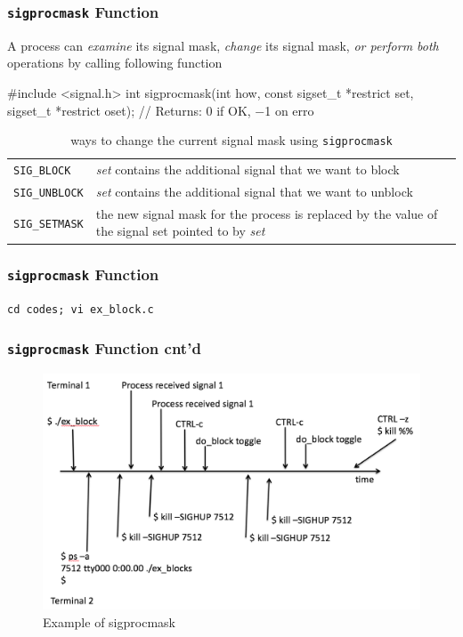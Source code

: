 \documentclass[newPxFont,sthlmFooter,nooffset]{beamer}
\begin{document}
\begin{frame}[fragile,t]
  \frametitle{\texttt{sigprocmask} Function}
A process can \textit{examine} its signal mask, \textit{change} its signal mask, \textit{or perform both} operations by calling following function

\begin{codedef}
#include <signal.h>
int sigprocmask(int how, const sigset_t *restrict set, 
                sigset_t *restrict oset);
// Returns: 0 if OK, −1 on erro    
\end{codedef}

\begin{table}[h]
  \centering
  \begin{tabular}{l | p{8cm}}
    \texttt{SIG\_BLOCK} & \textit{set} contains the additional signal that we want to block \\ 
    \texttt{SIG\_UNBLOCK} & \textit{set} contains the additional signal that we want to unblock \\ 
    \texttt{SIG\_SETMASK} & the new signal mask for the process is replaced by the value of the signal set pointed to by \textit{set}
  \end{tabular}
  \caption{ways to change the current signal mask using \texttt{sigprocmask}}
  \label{tab:sigprocmask}
\end{table}

\end{frame}



\begin{frame}
  \frametitle{\texttt{sigprocmask} Function}
\texttt{cd codes; vi ex\_block.c}


\end{frame}

\begin{frame}[fragile,t]
  \frametitle{\texttt{sigprocmask} Function cnt'd}
  \begin{figure}[h]
    \centering
    \includegraphics[width=\linewidth]{figure/fig_proc.png}
    \caption{Example of sigprocmask}
  \end{figure}

\end{frame}
\end{document}

